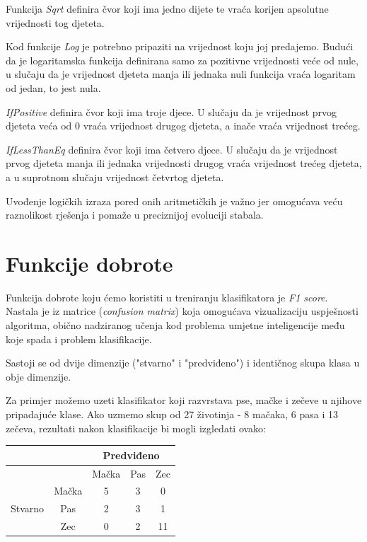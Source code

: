 \documentclass[times, utf8, zavrsni]{fer}
\begin{document}
Funkcija \textit{Sqrt} definira čvor koji ima jedno dijete te vraća korijen apsolutne vrijednosti tog djeteta.

Kod funkcije \textit{Log} je potrebno pripaziti na vrijednost koju joj predajemo. Budući da je logaritamska funkcija definirana samo za pozitivne vrijednosti veće od nule, u slučaju da je vrijednost djeteta manja ili jednaka nuli funkcija vraća logaritam od jedan, to jest nula.

\textit{IfPositive} definira čvor koji ima troje djece. U slučaju da je vrijednost prvog djeteta veća od 0 vraća vrijednost drugog djeteta, a inače vraća vrijednost trećeg.


\textit{IfLessThanEq} definira čvor koji ima četvero djece. U slučaju da je vrijednost prvog djeteta manja ili jednaka vrijednosti drugog vraća vrijednost trećeg djeteta, a u suprotnom slučaju vrijednost četvrtog djeteta.

Uvođenje logičkih izraza pored onih aritmetičkih je važno jer omogućava veću raznolikost rješenja i pomaže u preciznijoj evoluciji stabala. 

\section{Funkcije dobrote}

Funkcija dobrote koju ćemo koristiti u treniranju klasifikatora je \textit{F1 score}. Nastala je iz matrice (\textit{confusion matrix}) koja omogućava vizualizaciju uspješnosti algoritma, obično nadziranog učenja kod problema umjetne inteligencije među koje spada i problem klasifikacije.

Sastoji se od dvije dimenzije ("stvarno" i "predviđeno") i identičnog skupa klasa u obje dimenzije. 

Za primjer možemo uzeti klasifikator koji razvrstava pse, mačke i zečeve u njihove pripadajuće klase. Ako uzmemo skup od 27 životinja - 8 mačaka, 6 pasa i 13 zečeva, rezultati nakon klasifikacije bi mogli izgledati ovako:

\begin{center}
\begin{tabular}{|c|c|c|c|c|}
\hline
& & \multicolumn{3}{|c|}{Predviđeno} \\
\hline
& & Mačka & Pas & Zec \\
\hline
\multirow{3}{4em}{Stvarno} & Mačka & 5 & 3 & 0 \\

& Pas & 2 & 3 & 1 \\

& Zec & 0 & 2 & 11 \\
\hline

\end{tabular}
\end{center}
\end{document}
